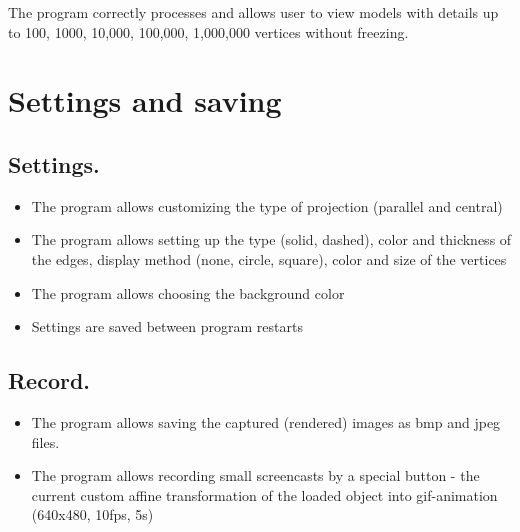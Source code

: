 \documentclass[12pt, a4paper]{article}
\begin{document}
  The program correctly processes and allows user to view models with details up to 100, 1000, 10,000, 100,000, 1,000,000  vertices without freezing.

\pagebreak

\section{Settings and saving}

\subsection{Settings.}
\begin{itemize}
\item The program allows customizing the type of projection (parallel and central)
\item The program allows setting up the type (solid, dashed), color and thickness of the edges, display method (none, circle, square), color and size of the vertices
\item The program allows choosing the background color
\item Settings are saved between program restarts
\end{itemize}

\subsection{Record.}
\begin{itemize}
\item The program allows saving the captured (rendered) images as bmp and jpeg files.
\item The program allows recording small screencasts by a special button - the current custom affine transformation of the loaded object into gif-animation (640x480, 10fps, 5s)
\end{itemize}
\end{document}

